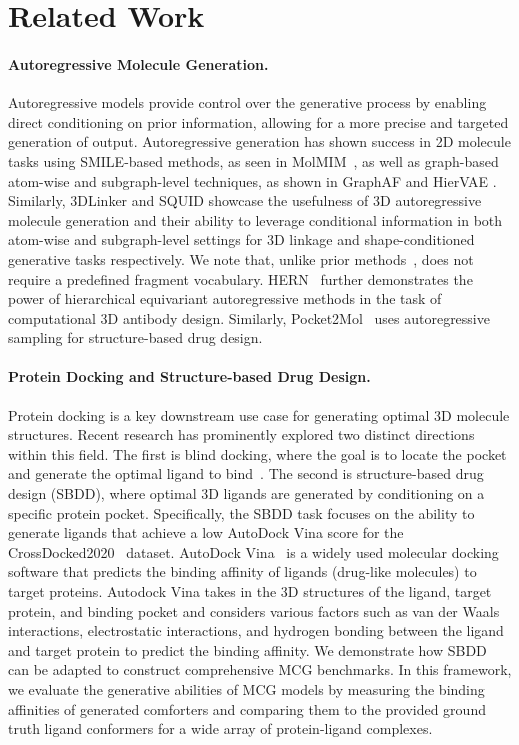 \section{Related Work}
\label{section:related-work}
\paragraph{Autoregressive Molecule Generation.} Autoregressive models provide control over the generative process by enabling direct conditioning on prior information, allowing for a more precise and targeted generation of output.
Autoregressive generation has shown success in 2D molecule tasks using SMILE-based methods, as seen in MolMIM~\citep{reidenbach2023improving}, as well as graph-based atom-wise and subgraph-level techniques, as shown in GraphAF \citep{graphaf} and HierVAE \citep{HierVAE}.
Similarly, 3DLinker \citep{3dlinker} and SQUID \citep{squid} showcase the usefulness of 3D autoregressive molecule generation and their ability to leverage conditional information in both atom-wise and subgraph-level settings for 3D linkage and shape-conditioned generative tasks respectively. 
 We note that, unlike prior methods~\citep{squid}, \model does not require a predefined fragment vocabulary.
HERN~\citep{jin2022antibody} further demonstrates the power of hierarchical equivariant autoregressive methods in the task of computational 3D antibody design. Similarly, Pocket2Mol~\citep{pocket2mol} uses autoregressive sampling for structure-based drug design.

\vspace{-1ex}
\paragraph{Protein Docking and Structure-based Drug Design.} Protein docking is a key downstream use case for generating optimal 3D molecule structures. 
Recent research has prominently explored two distinct directions within this field.
The first is blind docking, where the goal is to locate the pocket and generate the optimal ligand to bind~\citep{diffdock}. The second is structure-based drug design (SBDD), where optimal 3D ligands are generated by conditioning on a specific protein pocket. Specifically, the SBDD task focuses on the ability to generate ligands that achieve a low AutoDock Vina score for the CrossDocked2020~\citep{CrossDocked} dataset. AutoDock Vina~\citep{vina} is a widely used molecular docking software that predicts the binding affinity of ligands (drug-like molecules) to target proteins. Autodock Vina takes in the 3D structures of the ligand, target protein, and binding pocket and considers various factors such as van der Waals interactions, electrostatic interactions, and hydrogen bonding between the ligand and target protein to predict the binding affinity. 
We demonstrate how SBDD can be adapted to construct comprehensive MCG benchmarks. In this framework, we evaluate the generative abilities of MCG models by measuring the binding affinities of generated comforters and comparing them to the provided ground truth ligand conformers for a wide array of protein-ligand complexes.

